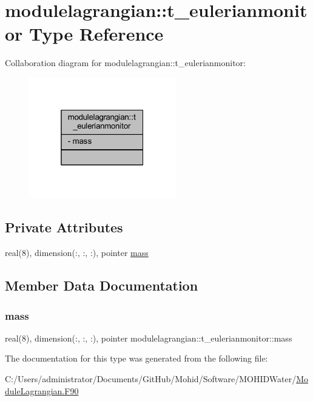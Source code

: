 \hypertarget{structmodulelagrangian_1_1t__eulerianmonitor}{}\section{modulelagrangian\+:\+:t\+\_\+eulerianmonitor Type Reference}
\label{structmodulelagrangian_1_1t__eulerianmonitor}


Collaboration diagram for modulelagrangian\+:\+:t\+\_\+eulerianmonitor\+:\nopagebreak
\begin{figure}[H]
\begin{center}
\leavevmode
\includegraphics[width=181pt]{structmodulelagrangian_1_1t__eulerianmonitor__coll__graph}
\end{center}
\end{figure}
\subsection*{Private Attributes}
\begin{DoxyCompactItemize}
\item 
real(8), dimension(\+:, \+:, \+:), pointer \mbox{\hyperlink{structmodulelagrangian_1_1t__eulerianmonitor_ae2026c677c89803ef88efc56afd3ce88}{mass}}
\end{DoxyCompactItemize}


\subsection{Member Data Documentation}
\mbox{\label{structmodulelagrangian_1_1t__eulerianmonitor_ae2026c677c89803ef88efc56afd3ce88}} 
\subsubsection{\texorpdfstring{mass}{mass}}
{\footnotesize\ttfamily real(8), dimension(\+:, \+:, \+:), pointer modulelagrangian\+::t\+\_\+eulerianmonitor\+::mass\hspace{0.3cm}{\ttfamily [private]}}



The documentation for this type was generated from the following file\+:\begin{DoxyCompactItemize}
\item 
C\+:/\+Users/administrator/\+Documents/\+Git\+Hub/\+Mohid/\+Software/\+M\+O\+H\+I\+D\+Water/\mbox{\hyperlink{_module_lagrangian_8_f90}{Module\+Lagrangian.\+F90}}\end{DoxyCompactItemize}
